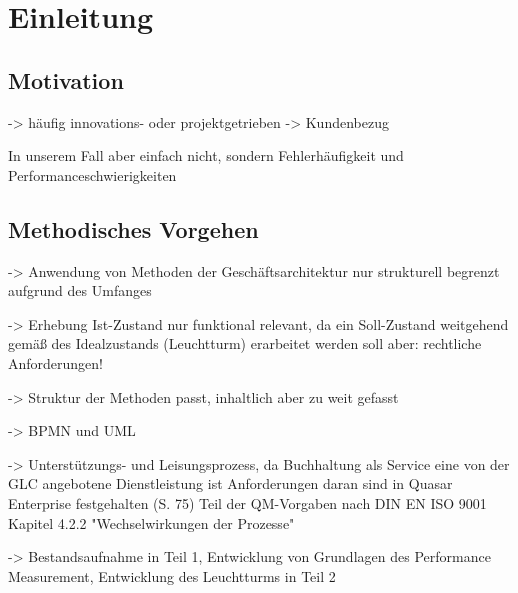 \chapter{Einleitung}

\section{Motivation}

-> häufig innovations- oder projektgetrieben
-> Kundenbezug

In unserem Fall aber einfach nicht, sondern Fehlerhäufigkeit und Performanceschwierigkeiten

\section{Methodisches Vorgehen}


-> Anwendung von Methoden der Geschäftsarchitektur nur strukturell begrenzt aufgrund des Umfanges

-> Erhebung Ist-Zustand nur funktional relevant, da ein Soll-Zustand weitgehend gemäß des Idealzustands (Leuchtturm) erarbeitet werden soll
aber: rechtliche Anforderungen!

-> Struktur der Methoden passt, inhaltlich aber zu weit gefasst

-> BPMN und UML

-> Unterstützungs- und Leisungsprozess, da Buchhaltung als Service eine von der GLC angebotene Dienstleistung ist
Anforderungen daran sind in Quasar Enterprise festgehalten (S. 75)
Teil der QM-Vorgaben nach DIN EN ISO 9001 Kapitel 4.2.2 "Wechselwirkungen der Prozesse" 

-> Bestandsaufnahme in Teil 1, Entwicklung von Grundlagen des Performance Measurement, Entwicklung des Leuchtturms in Teil 2

\subsection{}